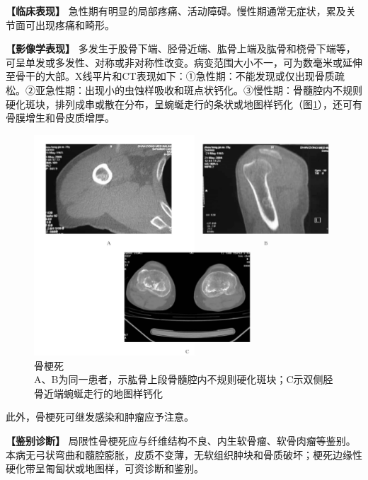 \textbf{【临床表现】}
急性期有明显的局部疼痛、活动障碍。慢性期通常无症状，累及关节面可出现疼痛和畸形。

\textbf{【影像学表现】}
多发生于股骨下端、胫骨近端、肱骨上端及肱骨和桡骨下端等，可呈单发或多发性、对称或非对称性改变。病变范围大小不一，可为数毫米或延伸至骨干的大部。X线平片和CT表现如下：①急性期：不能发现或仅出现骨质疏松。②亚急性期：出现小的虫蚀样吸收和斑点状钙化。③慢性期：骨髓腔内不规则硬化斑块，排列成串或散在分布，呈蜿蜒走行的条状或地图样钙化（图\ref{fig22-37}），还可有骨膜增生和骨皮质增厚。

\begin{figure}[!htbp]
 \centering
 \includegraphics[width=.7\textwidth,height=\textheight,keepaspectratio]{./images/Image00463.jpg}
 \captionsetup{justification=centering}
 \caption{骨梗死\\{\small A、B为同一患者，示肱骨上段骨髓腔内不规则硬化斑块；C示双侧胫骨近端蜿蜒走行的地图样钙化}}
 \label{fig22-37}
  \end{figure} 

此外，骨梗死可继发感染和肿瘤应予注意。

\textbf{【鉴别诊断】}
局限性骨梗死应与纤维结构不良、内生软骨瘤、软骨肉瘤等鉴别。本病无弓状弯曲和髓腔膨胀，皮质不变薄，无软组织肿块和骨质破坏；梗死边缘性硬化带呈匍匐状或地图样，可资诊断和鉴别。

\protect\hypertarget{text00030.html}{}{}

